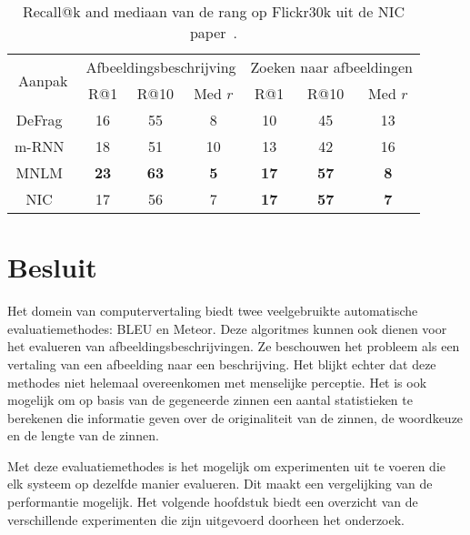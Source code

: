 \begin{table}
	\centering
	\begin{small}
		\setlength{\tabcolsep}{3pt}
		\begin{tabular}{|c|ccc|ccc|}
			\hline
			\multirow{2}{*}{Aanpak} & \multicolumn{3}{c|}{Afbeeldingsbeschrijving} & \multicolumn{3}{c|}{Zoeken naar afbeeldingen} \\
			& R@1 & R@10 & Med $r$ &  R@1 & R@10 & Med $r$ \\
			\hline
			\hline
			DeFrag~\cite{Karpathy2014} & 16 & 55 & 8             &    10 & 45 & 13  \\
			m-RNN~\cite{Mao2014}         &  18 & 51 & 10               &  13 & 42 & 16\\
			MNLM~\cite{Kiros2014}        &  \textbf{23}   & \textbf{63} & \textbf{5}        &  \textbf{17} & \textbf{57} & \textbf{8}   \\
			\hline
			NIC~\cite{Google}                           &  17 & 56  & 7               &    \textbf{17} & \textbf{57} & \textbf{7} \\
			\hline
		\end{tabular}
	\end{small}
	\caption[Recall@k and mediaan van de rang op Flickr30k uit de NIC paper]{Recall@k and mediaan van de rang op Flickr30k uit de NIC paper~\cite{Google}.\label{tab:recall@1030k}}
	\label{table:recall}
\end{table}

\section{Besluit}
Het domein van computervertaling biedt twee veelgebruikte automatische evaluatiemethodes: BLEU en Meteor. Deze algoritmes kunnen ook dienen voor het evalueren van afbeeldingsbeschrijvingen. Ze beschouwen het probleem als een vertaling van een afbeelding naar een beschrijving. Het blijkt echter dat deze methodes niet helemaal overeenkomen met menselijke perceptie. Het is ook mogelijk om op basis van de gegeneerde zinnen een aantal statistieken te berekenen die informatie geven over de originaliteit van de zinnen, de woordkeuze en de lengte van de zinnen. 

Met deze evaluatiemethodes is het mogelijk om experimenten uit te voeren die elk systeem op dezelfde manier evalueren. Dit maakt een vergelijking van de performantie mogelijk. Het volgende hoofdstuk biedt een overzicht van de verschillende experimenten die zijn uitgevoerd doorheen het onderzoek.


